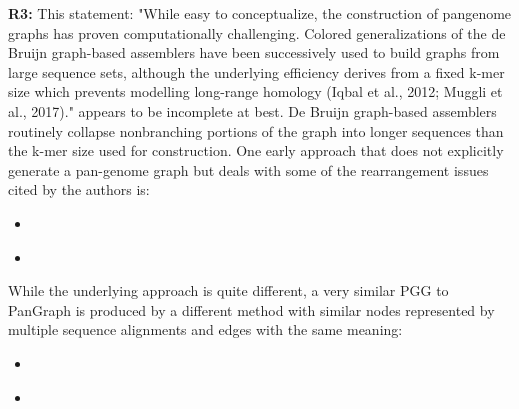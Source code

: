 \documentclass[aps,rmp,onecolumn]{revtex4-1}
\newcommand{\Marco}[1]{{\color{gray}Marco: #1}}
\newcommand{\reviewer}[2]{\textbf{#1:} #2\vskip 5mm}
\begin{document}
\reviewer{R3}{This statement: "While easy to conceptualize, the construction of pangenome graphs has proven computationally challenging. Colored generalizations of the de Bruijn graph-based assemblers have been successively used to build graphs from large sequence sets, although the underlying efficiency derives from a fixed k-mer size which prevents modelling long-range homology (Iqbal et al., 2012; Muggli et al., 2017)." appears to be incomplete at best. De Bruijn graph-based assemblers routinely collapse nonbranching portions of the graph into longer sequences than the k-mer size used for construction.
      One early approach that does not explicitly generate a pan-genome graph but deals with some of the rearrangement issues cited by the authors is:
      \begin{itemize}
            \item \cite{angiuoli2011improving}
            \item \cite{angiuoli2011mugsy}
      \end{itemize}
      While the underlying approach is quite different, a very similar PGG to PanGraph is produced by a different method with similar nodes represented by multiple sequence alignments and edges with the same meaning:
      \begin{itemize}
            \item \cite{sutton2021pan}
            \item \cite{chan2015novel}
      \end{itemize}}
\end{document}
